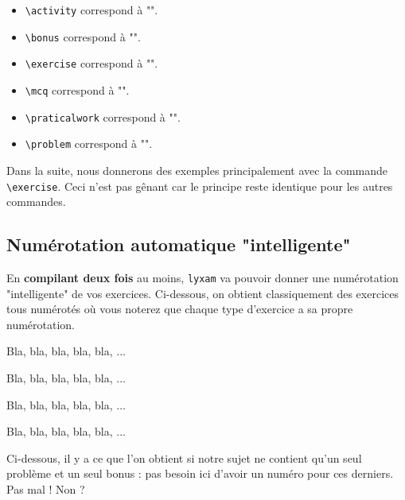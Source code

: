 \documentclass[12pt,a4paper]{article}
\makeatletter
\theoremstyle{definition}
\newcommand\resetallcnt{
		\setcounter{lyxam@counter@topic}{0}
		\setcounter{lyxam@counter@exercise}{0}
		\setcounter{lyxam@counter@problem}{0}
		\setcounter{lyxam@counter@bonus}{0}
		\setcounter{lyxam@counter@subpart}{0}
	}
\makeatother
\begin{document}
\begin{itemize}[label=\textbullet]
\makeatletter
    \item \verb+\activity+ correspond à "\lyxam@text@activity{}".
    
    \item \verb+\bonus+ correspond à "\lyxam@text@bonus{}".
    
    \item \verb+\exercise+ correspond à "\lyxam@text@exercise{}".
    
    \item \verb+\mcq+ correspond à "\lyxam@text@mcq{}".
    
    \item \verb+\praticalwork+ correspond à "\lyxam@text@praticalwork{}".
    
    \item \verb+\problem+ correspond à "\lyxam@text@problem{}".
\makeatother
\end{itemize}

Dans la suite, nous donnerons des exemples principalement avec la commande \verb+\exercise+. Ceci n'est pas gênant car le principe reste identique pour les autres commandes.


    \subsection{Numérotation automatique "intelligente"}

En \textbf{compilant deux fois} au moins, \verb+lyxam+ va pouvoir donner une numérotation "intelligente" de vos exercices. Ci-dessous, on obtient classiquement des exercices tous numérotés où vous noterez que chaque type d'exercice a sa propre numérotation.


\begin{tcblisting}{}
\exercise
Bla, bla, bla, bla, bla, ...

\exercise
Bla, bla, bla, bla, bla, ...

\problem
Bla, bla, bla, bla, bla, ...

\problem
Bla, bla, bla, bla, bla, ...
\end{tcblisting}


Ci-dessous, il y a ce que l'on obtient si notre sujet ne contient qu'un seul problème et un seul bonus : pas besoin ici d'avoir un numéro pour ces derniers. Pas mal ! Non ?

\resetallcnt{}
\end{document}
